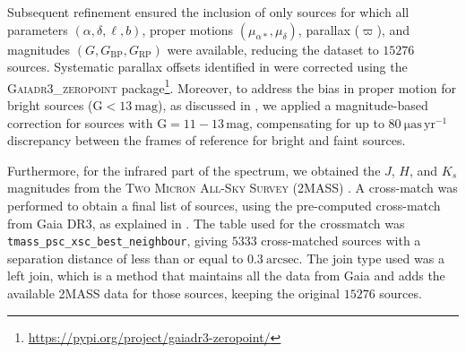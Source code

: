 \documentclass{aa}
\begin{document}
Subsequent refinement ensured the inclusion of only sources for which all parameters $(\alpha,\delta,\ell,b)$, proper motions $(\mu_{\alpha*},\mu_\delta)$, parallax ($\varpi$), and magnitudes $(G, G_\mathrm{BP}, G_\mathrm{RP})$ were available, reducing the dataset to $15276$ sources. Systematic parallax offsets identified in \citet{2021A&A...649A...4L} were corrected using the \textsc{Gaiadr3\_zeropoint} package\footnote{\url{https://pypi.org/project/gaiadr3-zeropoint/}}. Moreover, to address the bias in proper motion for bright sources ($\mathrm{G}<13~\mathrm{mag}$), as discussed in \citet{2021A&A...649A.124C}, we applied a magnitude-based correction for sources with $\mathrm{G} = 11-13\,\mathrm{mag}$, compensating for up to $80~\mathrm{\mu as\,yr^{-1}}$ discrepancy between the frames of reference for bright and faint sources.

Furthermore, for the infrared part of the spectrum, we obtained the $J$, $H$, and $K_s$ magnitudes from the \textsc{Two Micron All-Sky Survey} (2MASS) \citep{2006AJ....131.1163S}. A cross-match was performed to obtain a final list of sources, using the pre-computed cross-match from Gaia DR3, as explained in \citet{2022gdr3.reptE..15M}. The table used for the crossmatch was \texttt{tmass\_psc\_xsc\_best\_neighbour}, giving $5333$ cross-matched sources with a separation distance of less than or equal to $0.3~\textrm{arcsec}$. The join type used was a left join, which is a method that maintains all the data from Gaia and adds the available 2MASS data for those sources, keeping the original $15276$  sources.
\end{document}
